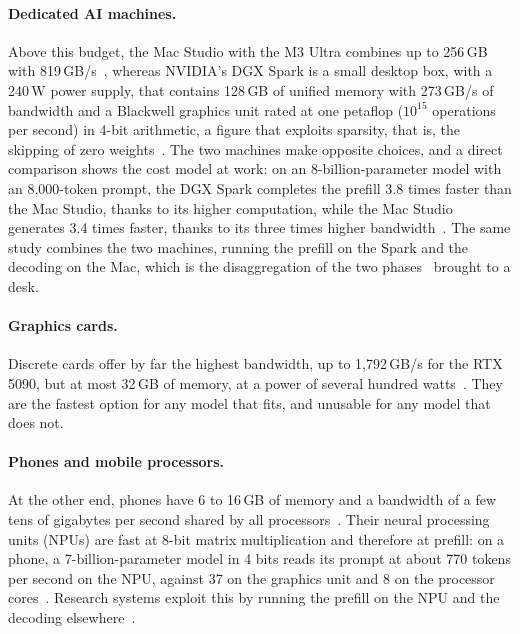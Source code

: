 \paragraph{Dedicated AI machines.} Above this budget, the Mac Studio with the M3 Ultra combines up to 256\,GB with
819\,GB/s~\cite{apple2025macstudio}, whereas NVIDIA's DGX Spark is a small desktop box, with a 240\,W power supply, that
contains 128\,GB of unified memory with 273\,GB/s of bandwidth and a Blackwell graphics unit rated at one petaflop
($10^{15}$ operations per second) in 4-bit arithmetic, a figure that exploits sparsity, that is, the skipping of zero
weights~\cite{nvidia2026dgxspark}. The two machines make opposite choices, and a direct comparison shows the cost model at
work: on an 8-billion-parameter model with an 8,000-token prompt, the DGX Spark completes the prefill 3.8 times faster
than the Mac Studio, thanks to its higher computation, while the Mac Studio generates 3.4 times faster, thanks to its
three times higher bandwidth~\cite{exo2025spark}. The same study combines the two machines, running the prefill on the
Spark and the decoding on the Mac, which is the disaggregation of the two phases~\cite{patel2024splitwise} brought to a
desk.

\paragraph{Graphics cards.} Discrete cards offer by far the highest bandwidth, up to 1,792\,GB/s for the RTX 5090, but at
most 32\,GB of memory, at a power of several hundred watts~\cite{nvidia2026geforce}. They are the fastest option for any
model that fits, and unusable for any model that does not.

\paragraph{Phones and mobile processors.} At the other end, phones have 6 to 16\,GB of memory and a bandwidth of a few
tens of gigabytes per second shared by all processors~\cite{li2025collaborative,xue2024powerinfer2}. Their neural
processing units (NPUs) are fast at 8-bit matrix multiplication and therefore at prefill: on a phone, a
7-billion-parameter model in 4 bits reads its prompt at about 770 tokens per second on the NPU, against 37 on the
graphics unit and 8 on the processor cores~\cite{xue2024powerinfer2}. Research systems exploit this by running the
prefill on the NPU and the decoding elsewhere~\cite{xu2025npu}.


